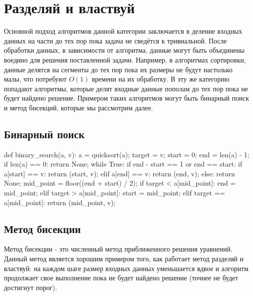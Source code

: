 \section{Разделяй и властвуй}

Основной подход алгоритмов данной категории заключается 
в деление входных данных на части до тех пор пока задача 
не сведётся к тривиальной. После обработки данных, в 
зависимости от алгоритма, данные могут быть объединены 
воедино для решения поставленной задачи. Например, 
в алгоритмах сортировки, данные делятся на 
сегменты до тех пор пока их размеры не будут 
настолько малы, что потребуют $O(1)$ времени 
на их обработку. В эту же категорию попадают 
алгоритмы, которые делят входные данные пополам
до тех пор пока не будет найдено решение. Примером
таких алгоритмов могут быть бинарный поиск и 
метод бисекций, которые мы рассмотрим далее.

\subsection{Бинарный поиск}

\begin{python}
def binary_search(a, v):
	a = quicksort(a);
	target = v;
	start = 0;
	end = len(a) - 1;
	if len(a) == 0:
		return None;
	while True:
		if end - start == 1 or end == start:
			if a[start] == v:
				return (start, v);
			elif a[end] == v:
				return (end, v);
			else:
				return None;
		mid_point = floor((end + start) / 2);
		if target < a[mid_point]:
			end = mid_point;
		elif target > a[mid_point]:
			start = mid_point;
		elif target == a[mid_point]:
			return (mid_point, v);
\end{python}



\subsection{Метод бисекции}

Метод бисекции - это численный метод приближенного решения уравнений.
Данный метод является хорошим примером того, как работает метод разделяй и властвуй:
на каждом шаге размер входных данных уменьшается вдвое и алгоритм продолжает 
свое выполнение пока не будет найдено решение (точнее не будет достигнут 
порог). 

